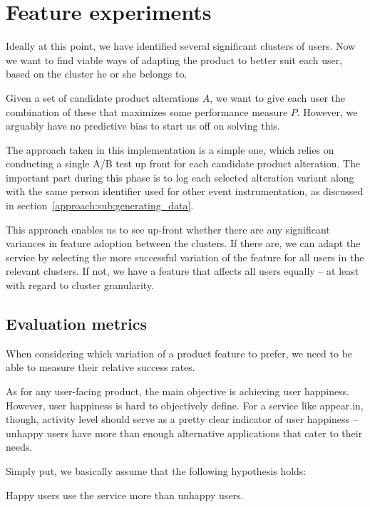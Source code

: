 \section{Feature experiments}
\label{approach:sec:feature_experiments}

Ideally at this point, we have identified several significant clusters of users. Now we want to find viable ways of adapting the product to better suit each user, based on the cluster he or she belongs to.

Given a set of candidate product alterations $A$, we want to give each user the combination of these that maximizes some performance measure $P$. However, we arguably have no predictive bias to start us off on solving this.

The approach taken in this implementation is a simple one, which relies on conducting a single A/B test up front for each candidate product alteration. The important part during this phase is to log each selected alteration variant along with the same person identifier used for other event instrumentation, as discussed in section~\ref{approach:sub:generating_data}.

This approach enables us to see up-front whether there are any significant variances in feature adoption between the clusters. If there are, we can adapt the service by selecting the more successful variation of the feature for all users in the relevant clusters. If not, we have a feature that affects all users equally -- at least with regard to cluster granularity.

\subsection{Evaluation metrics} %
\label{approach:sec:evaluation_metrics}

When considering which variation of a product feature to prefer, we need to be able to measure their relative success rates.

As for any user-facing product, the main objective is achieving user happiness. However, user happiness is hard to objectively define. For a service like appear.in, though, activity level should serve as a pretty clear indicator of user happiness -- unhappy users have more than enough alternative applications that cater to their needs.

Simply put, we basically assume that the following hypothesis holds:

\begin{hypothesis}
  Happy users use the service more than unhappy users.
\end{hypothesis}

